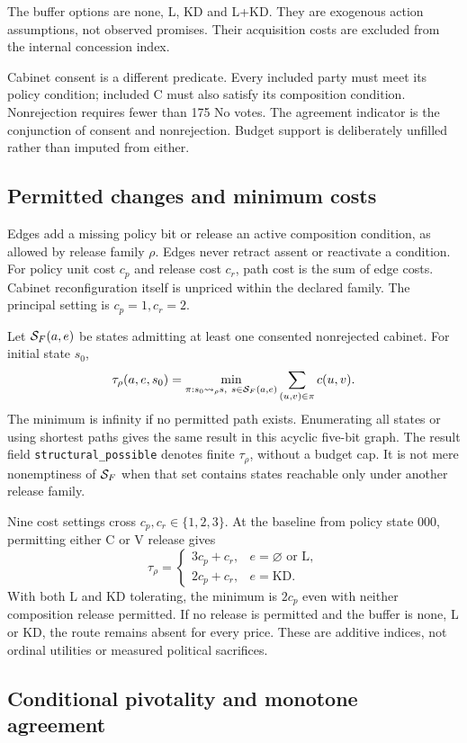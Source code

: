 The buffer options are none, L, KD and L+KD. They are exogenous action assumptions, not observed promises. Their acquisition costs are excluded from the internal concession index.

Cabinet consent is a different predicate. Every included party must meet its policy condition; included C must also satisfy its composition condition. Nonrejection requires fewer than 175 No votes. The agreement indicator is the conjunction of consent and nonrejection. Budget support is deliberately unfilled rather than imputed from either.

\subsection{Permitted changes and minimum costs}

Edges add a missing policy bit or release an active composition condition, as allowed by release family \(\rho\). Edges never retract assent or reactivate a condition. For policy unit cost \(c_p\) and release cost \(c_r\), path cost is the sum of edge costs. Cabinet reconfiguration itself is unpriced within the declared family. The principal setting is \(c_p=1,c_r=2\).

Let \(\mathcal{S}_F(a,e)\) be states admitting at least one consented nonrejected cabinet. For initial state \(s_0\),
\[
\tau_\rho(a,e,s_0)=
\min_{\pi:s_0\leadsto_\rho s,\ s\in \mathcal{S}_F(a,e)}
\sum_{(u,v)\in\pi}c(u,v).
\]
The minimum is infinity if no permitted path exists. Enumerating all states or using shortest paths gives the same result in this acyclic five-bit graph. The result field \texttt{structural\_possible} denotes finite \(\tau_\rho\), without a budget cap. It is not mere nonemptiness of \(\mathcal{S}_F\) when that set contains states reachable only under another release family.

Nine cost settings cross \(c_p,c_r\in\{1,2,3\}\). At the baseline from policy state \(000\), permitting either C or V release gives
\[
\tau_{\rho}=
\begin{cases}
3c_p+c_r,&e=\varnothing\text{ or L},\\
2c_p+c_r,&e=\text{KD}.
\end{cases}
\]
With both L and KD tolerating, the minimum is \(2c_p\) even with neither composition release permitted. If no release is permitted and the buffer is none, L or KD, the route remains absent for every price. These are additive indices, not ordinal utilities or measured political sacrifices.

\subsection{Conditional pivotality and monotone agreement}

